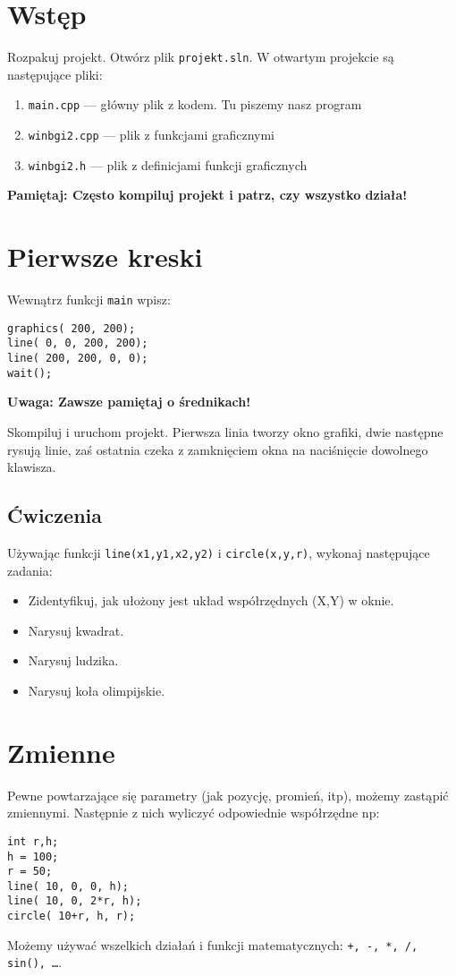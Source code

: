 \documentclass{instrukcja}
\begin{document}
\author{\L{}. \L{}aniewski-Wo\l{}\l{}k}
\materialtitle

\section*{Wstęp}

Rozpakuj projekt. Otwórz plik {\tt projekt.sln}. W otwartym projekcie są następujące pliki:
\begin{enumerate}
\item {\tt main.cpp} --- główny plik z kodem. Tu piszemy nasz program
\item {\tt winbgi2.cpp} --- plik z funkcjami graficznymi
\item {\tt winbgi2.h} --- plik z definicjami funkcji graficznych
\end{enumerate}

{\bf{\red Pamiętaj:} Często kompiluj projekt i patrz, czy wszystko działa!}

\section{Pierwsze kreski}

Wewnątrz funkcji {\tt main} wpisz:
\begin{verbatim}
graphics( 200, 200);
line( 0, 0, 200, 200);
line( 200, 200, 0, 0);
wait();
\end{verbatim}
{\bf{\red Uwaga:} Zawsze pamiętaj o średnikach!}

Skompiluj i uruchom projekt. Pierwsza linia tworzy okno grafiki, dwie następne rysują linie, zaś ostatnia czeka z zamknięciem okna na naciśnięcie dowolnego klawisza.

\subsection*{Ćwiczenia}
Używając funkcji {\tt line(x1,y1,x2,y2)} i {\tt circle(x,y,r)}, wykonaj następujące zadania:
\begin{itemize}

\item Zidentyfikuj, jak ułożony jest układ współrzędnych (X,Y) w oknie.
\item Narysuj kwadrat.
\item Narysuj ludzika.
\item Narysuj koła olimpijskie.
\end{itemize}

\section{Zmienne}
Pewne powtarzające się parametry (jak pozycję, promień, itp), możemy zastąpić zmiennymi. Następnie z nich wyliczyć odpowiednie współrzędne np:
\begin{verbatim}
int r,h;
h = 100;
r = 50;
line( 10, 0, 0, h);
line( 10, 0, 2*r, h);
circle( 10+r, h, r);
\end{verbatim}
Możemy używać wszelkich działań i funkcji matematycznych: {\tt +, -, *, /, sin(), \ldots}.
\end{document}
